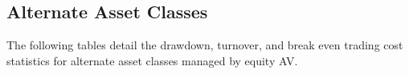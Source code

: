 \subsection{Alternate Asset Classes}
The following tables detail the drawdown, turnover, and break even trading cost statistics for alternate asset classes managed by equity AV. 
%
%

\clearpage

\clearpage